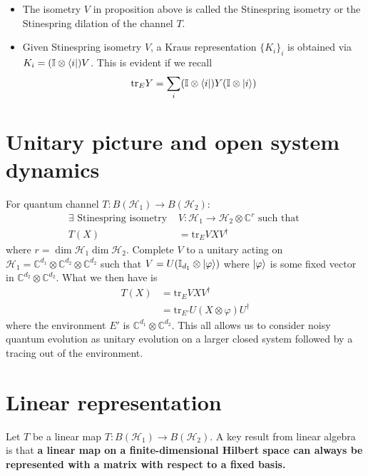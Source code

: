 \documentclass[../../note.tex]{subfiles}
\begin{document}
\begin{itemize}
    \item The isometry $V$ in proposition above is called the Stinespring isometry or the Stinespring dilation of the channel $T$. 
    \item Given Stinespring isometry $V$, a Kraus representation $\{K_i\}_i$ is obtained via $K_i=(\mathbb{I} \otimes \bra{i})V$. This is evident if we recall
    \begin{align}
        \text{tr}_E Y = \sum_i (\mathbb{I} \otimes \bra{i}) Y (\mathbb{I} \otimes \ket{i})
    \end{align}
\end{itemize}

\section{Unitary picture and open system dynamics}
For quantum channel $T: B(\mathcal{H}_1) \rightarrow B(\mathcal{H}_2)$: 
\begin{align}
    \exists \text{ Stinespring isometry } &V: \mathcal{H}_1 \rightarrow \mathcal{H}_2 \otimes \mathbb{C}^r \text{ such that } \\
    T(X)&= \text{tr}_E VXV^{\dagger}
\end{align}
where $r=\dim\mathcal{H}_1\dim\mathcal{H}_2$. Complete $V$ to a unitary acting on $ \mathcal{H}_1 = \mathbb{C}^{d_1} \otimes \mathbb{C}^{d_2} \otimes \mathbb{C}^{d_2}$ such that $V=U(\mathbb{I}_{d_1} \otimes \ket{\varphi})$ where $\ket{\varphi}$ is some fixed vector in $\mathbb{C}^{d_2}\otimes \mathbb{C}^{d_2}$. What we then have is 
\begin{align}
    T(X) &= \text{tr}_E VXV^{\dagger} \\
    &= \text{tr}_{E'} U(X \otimes \varphi) U^{\dagger} 
\end{align}
where the environment $E'$ is $\mathbb{C}^{d_1}\otimes \mathbb{C}^{d_2}$. This all allows us to consider noisy quantum evolution as unitary evolution on a larger closed system followed by a tracing out of the environment.

\section{Linear representation}
Let $T$ be a linear map $T: B(\mathcal{H}_1) \rightarrow B(\mathcal{H}_2)$. A key result from linear algebra is that \textbf{a linear map on a finite-dimensional Hilbert space can always be represented with a matrix with respect to a fixed basis.} 
\end{document}

